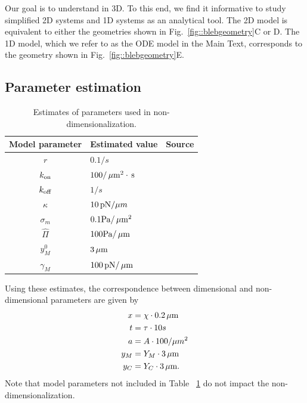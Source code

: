 Our goal is to understand in 3D. To this end, we find it informative to study simplified 2D systems and 1D systems as an analytical tool. The 2D model is equivalent to either the geometries shown in  Fig.~\ref{fig::blebgeometry}C or D. The 1D model, which we refer to as the ODE model in the Main Text, corresponds to the geometry shown in Fig.~\ref{fig::blebgeometry}E. 

\subsection{Parameter estimation}
\begin{table}[h!]
\caption{Estimates of parameters used in non-dimensionalization.}\centering \label{tab:parameterestimates} 
\begin{tabular}{ c  l  l}
\hline
Model parameter & Estimated value & Source \\
\hline
$r$ & $0.1/s$ & \cite{Fritzsche:2014jw}\\
$k_{\mbox{\scriptsize on}}$ & $100/ \,\mu\mbox{m}^2 \cdot \,\mbox{s}$  & \cite{Charras:2008bz}\\
$k_{\mbox{\scriptsize off}} $ & $ 1/s$ & \cite{Fritzsche:2014jw}\\
$\kappa$ & $10 \,\mbox{pN}/ \mu m$ &  \cite{Charras:2008bz}\\
$\sigma_m$ & $0.1 \mbox{Pa}/ \,\mu\mbox{m}^2$ & \cite{Charras:2008bz}\\
$\hat{\Pi}$ & $100 \mbox{Pa}/ \,\mu\mbox{m}$ & \cite{Charras:2008bz}\\
$y_M^0$ & $3 \,\mu\mbox{m}$ & \cite{Clark:2013ef}\\
$\gamma_M$ & $100 \,\mbox{pN}/ \,\mu\mbox{m}$ &  \cite{Peukes:2014fw}\\
\hline
\end{tabular}
\end{table}

Using these estimates, the correspondence between dimensional and non-dimensional parameters are given by
\begin{align} 
 x  %
 & =  \chi \cdot 0.2 \mum \\
 t %
 &=  \tau \cdot 10s \\
a %
&= A \cdot 100 /\mu m^2 \\
y_M %
&= Y_M \cdot 3 \mum \\
y_C %
&= Y_C \cdot 3 \mum.
\end{align}
Note that model parameters not included in Table ~\ref{tab:parameterestimates}  do not impact the non-dimensionalization.

